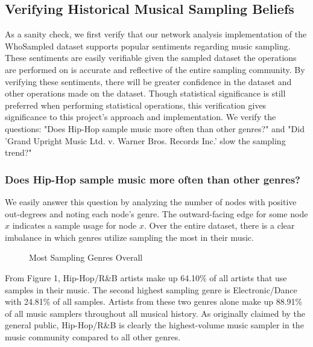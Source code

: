\documentclass[pageno]{jpaper}
\begin{document}
\subsection{Verifying Historical Musical Sampling Beliefs}
As a sanity check, we first verify that our network analysis implementation of the WhoSampled dataset supports popular sentiments regarding music sampling. These sentiments are easily verifiable given the sampled dataset the operations are performed on is accurate and reflective of the entire sampling community. By verifying these sentiments, there will be greater confidence in the dataset and other operations made on the dataset. Though statistical significance is still preferred when performing statistical operations, this verification gives significance to this project's approach and implementation. We verify the questions: "Does Hip-Hop sample music more often than other genres?" and "Did 'Grand Upright Music Ltd. v. Warner Bros. Records Inc.' slow the sampling trend?"
\subsubsection{Does Hip-Hop sample music more often than other genres?}
We easily answer this question by analyzing the number of nodes with positive out-degrees and noting each node's genre. The outward-facing edge for some node $x$ indicates a sample usage for node $x$. Over the entire dataset, there is a clear imbalance in which genres utilize sampling the most in their music. 
\begin{figure}[H]
\caption{Most Sampling Genres Overall}
\label{fig:fig1}
\centering
\end{figure}
From Figure 1, Hip-Hop/R\&B artists make up 64.10\% of all artists that use samples in their music. The second highest sampling genre is Electronic/Dance with 24.81\% of all samples. Artists from these two genres alone make up 88.91\% of all music samplers throughout all musical history. As originally claimed by the general public, Hip-Hop/R\&B is clearly the highest-volume music sampler in the music community compared to all other genres. 
\end{document}
